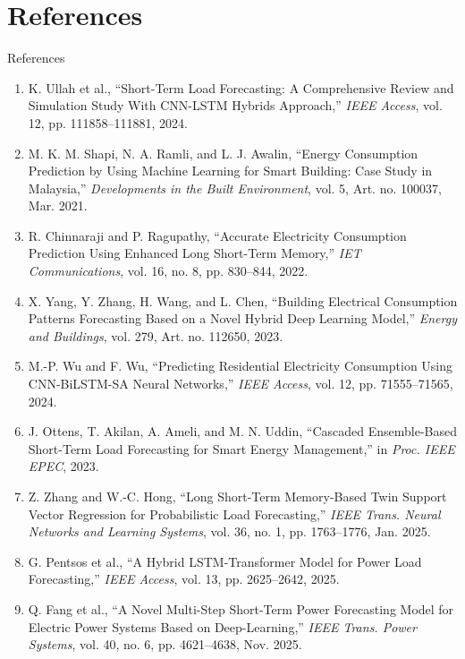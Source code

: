 \documentclass[aspectratio=169]{beamer}
\begin{document}
\section{References}
\begin{frame}[allowframebreaks]{References}
  \footnotesize
  \begin{enumerate}
    \item K. Ullah et al., ``Short-Term Load Forecasting: A Comprehensive Review and Simulation Study With CNN-LSTM Hybrids Approach,'' \emph{IEEE Access}, vol. 12, pp. 111858--111881, 2024.
    \item M. K. M. Shapi, N. A. Ramli, and L. J. Awalin, ``Energy Consumption Prediction by Using Machine Learning for Smart Building: Case Study in Malaysia,'' \emph{Developments in the Built Environment}, vol. 5, Art. no. 100037, Mar. 2021.
    \item R. Chinnaraji and P. Ragupathy, ``Accurate Electricity Consumption Prediction Using Enhanced Long Short-Term Memory,'' \emph{IET Communications}, vol. 16, no. 8, pp. 830--844, 2022.
    \item X. Yang, Y. Zhang, H. Wang, and L. Chen, ``Building Electrical Consumption Patterns Forecasting Based on a Novel Hybrid Deep Learning Model,'' \emph{Energy and Buildings}, vol. 279, Art. no. 112650, 2023.
    \item M.-P. Wu and F. Wu, ``Predicting Residential Electricity Consumption Using CNN-BiLSTM-SA Neural Networks,'' \emph{IEEE Access}, vol. 12, pp. 71555--71565, 2024.
    \item J. Ottens, T. Akilan, A. Ameli, and M. N. Uddin, ``Cascaded Ensemble-Based Short-Term Load Forecasting for Smart Energy Management,'' in \emph{Proc. IEEE EPEC}, 2023.
    \item Z. Zhang and W.-C. Hong, ``Long Short-Term Memory-Based Twin Support Vector Regression for Probabilistic Load Forecasting,'' \emph{IEEE Trans. Neural Networks and Learning Systems}, vol. 36, no. 1, pp. 1763--1776, Jan. 2025.
    \item G. Pentsos et al., ``A Hybrid LSTM-Transformer Model for Power Load Forecasting,'' \emph{IEEE Access}, vol. 13, pp. 2625--2642, 2025.
    \item Q. Fang et al., ``A Novel Multi-Step Short-Term Power Forecasting Model for Electric Power Systems Based on Deep-Learning,'' \emph{IEEE Trans. Power Systems}, vol. 40, no. 6, pp. 4621--4638, Nov. 2025.

\end{enumerate}
\end{frame}
\end{document}
